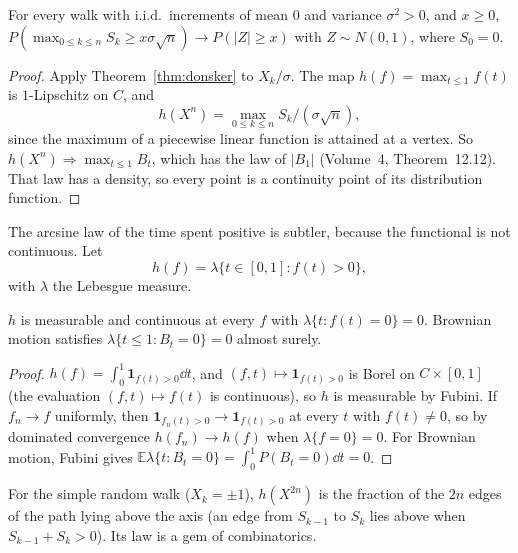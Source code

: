 \begin{corollary}\label{cor:max}
For every walk with i.i.d.\ increments of mean $0$ and variance $\sigma^2>0$, and $x\ge0$, $P(\max_{0\le k\le n}S_k\ge x\sigma\sqrt n)\to P(|Z|\ge x)$ with $Z\sim N(0,1)$, where $S_0=0$.
\end{corollary}
\begin{proof}
Apply Theorem~\ref{thm:donsker} to $X_k/\sigma$. The map $h(f)=\max_{t\le1}f(t)$ is $1$-Lipschitz on $C$, and
\[
h(X^n)=\max_{0\le k\le n}S_k/(\sigma\sqrt n),
\]
since the maximum of a piecewise linear function is attained at a vertex. So $h(X^n)\Rightarrow\max_{t\le1}B_t$, which has the law of $|B_1|$ (Volume~4, Theorem~12.12). That law has a
density, so every point is a continuity point of its distribution function.
\end{proof}

The arcsine law of the time spent positive is subtler, because the functional is not continuous. Let
\[
h(f)=\lambda\{t\in[0,1]:f(t)>0\},
\]
with $\lambda$ the Lebesgue measure.

\begin{lemma}\label{lem:occupcont}
$h$ is measurable and continuous at every $f$ with $\lambda\{t:f(t)=0\}=0$. Brownian motion satisfies $\lambda\{t\le1:B_t=0\}=0$ almost surely.
\end{lemma}
\begin{proof}
$h(f)=\int_0^1\mathbf 1_{f(t)>0}\dd t$, and $(f,t)\mapsto\mathbf 1_{f(t)>0}$ is Borel on $C\times[0,1]$ (the evaluation $(f,t)\mapsto f(t)$ is continuous), so $h$ is measurable by Fubini. If
$f_n\to f$ uniformly, then $\mathbf 1_{f_n(t)>0}\to\mathbf 1_{f(t)>0}$ at every $t$ with $f(t)\ne0$, so by dominated convergence $h(f_n)\to h(f)$ when $\lambda\{f=0\}=0$. For Brownian
motion, Fubini gives $\mathbb E\lambda\{t:B_t=0\}=\int_0^1P(B_t=0)\dd t=0$.
\end{proof}

For the simple random walk ($X_k=\pm1$), $h(X^{2n})$ is the fraction of the $2n$ edges of the path lying above the axis (an edge from $S_{k-1}$ to $S_k$ lies above
when $S_{k-1}+S_k>0$). Its law is a gem of combinatorics.

